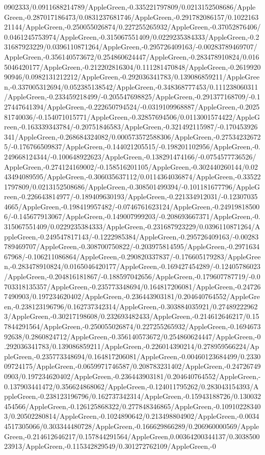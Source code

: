 {\begin{tikzternal}
{0902333/0.0911688214789/AppleGreen,-0.335221797809/0.0213152508686/AppleGreen,-0.287017186473/0.0831237681746/AppleGreen,-0.291782086157/0.102216321144/AppleGreen,-0.250055026874/0.227255265932/AppleGreen,-0.37052876406/0.0461245753974/AppleGreen,-0.315067551409/0.0229235384333/AppleGreen,-0.231687923229/0.0396110871264/AppleGreen,-0.295726409163/-0.00283789469707/AppleGreen,-0.356140573672/0.254860624447/AppleGreen,-0.283478910824/0.0165046420177/AppleGreen,-0.212202816304/0.111281470848/AppleGreen,-0.261992090946/0.0982131212212/AppleGreen,-0.292036341783/0.139086859211/AppleGreen,-0.337005312694/0.052385138542/AppleGreen,-0.348368777453/0.111238060311/AppleGreen,-0.233459218499/-0.205547698825/AppleGreen,-0.291377168709/-0.127447641394/AppleGreen,-0.222650794524/-0.0319109968887/AppleGreen,-0.202581740036/-0.154071015771/AppleGreen,-0.32857694506/0.0113001574422/AppleGreen,-0.163339343784/-0.20751846583/AppleGreen,-0.321492115987/-0.170453926341/AppleGreen,-0.268684324082/0.000573572588306/AppleGreen,-0.275342326725/-0.176766509837/AppleGreen,-0.144021205515/-0.198201102956/AppleGreen,-0.249668124344/-0.100648922623/AppleGreen,-0.138291474166/-0.0754577736526/AppleGreen,-0.274124169002/-0.158516201105/AppleGreen,-0.302440260144/0.0243494089595/AppleGreen,-0.306035637112/0.0114364036874/AppleGreen,-0.335221797809/0.0213152508686/AppleGreen,-0.308501499394/-0.101181677796/AppleGreen,-0.226643814977/-0.189409630193/AppleGreen,-0.221334912031/-0.123070354665/AppleGreen,-0.198419957482/-0.0746761623124/AppleGreen,-0.249198185006/-0.145677913067/AppleGreen,-0.149007999203/-0.208693667371/AppleGreen,-0.315067551409/0.0229235384333/AppleGreen,-0.231687923229/0.0396110871264/AppleGreen,-0.249547817143/-0.1222985384/AppleGreen,-0.295726409163/-0.00283789469707/AppleGreen,-0.308700750822/-0.203975814595/AppleGreen,-0.297163467968/-0.106211086864/AppleGreen,-0.290820337837/-0.176605179283/AppleGreen,-0.283478910824/0.0165046420177/AppleGreen,-0.169427454289/-0.12405786023/AppleGreen,-0.204816181867/-0.188597042656/AppleGreen,-0.179607787719/-0.0703318135357/AppleGreen,-0.235773348694/0.164817206081/AppleGreen,-0.247267490903/0.197234620402/AppleGreen,-0.236443903181/0.204640764552/AppleGreen,-0.238123196796/0.162737342314/AppleGreen,-0.303884035921/0.274892229623/AppleGreen,-0.30217198608/0.232693482433/AppleGreen,-0.214612646217/0.157844291564/AppleGreen,-0.250055026874/0.227255265932/AppleGreen,-0.169467392638/0.2860824712/AppleGreen,-0.356140573672/0.254860624447/AppleGreen,-0.292036341783/0.139086859211/AppleGreen,-0.226014390214/0.278959566224/AppleGreen,-0.235773348694/0.164817206081/AppleGreen,-0.00460123684499/0.233009724175/AppleGreen,-0.0659971746587/0.208783231402/AppleGreen,-0.247267490903/0.197234620402/AppleGreen,-0.236443903181/0.204640764552/AppleGreen,-0.137903441472/0.356624868062/AppleGreen,-0.124011795262/0.283043154393/AppleGreen,-0.238123196796/0.162737342314/AppleGreen,-0.15943188726/0.130032454566/AppleGreen,-0.126125868322/0.277848346865/AppleGreen,-0.109102283403/0.20502280814/AppleGreen,-0.1024890642/0.213498804902/AppleGreen,-0.00344517305066/0.303344480728/AppleGreen,-0.166629866289/0.206960000569/AppleGreen,-0.214612646217/0.157844291564/AppleGreen,0.00364200344137/0.303850023913/AppleGreen,-0.115342829549/0.301272762109/AppleGreen,-0}
\end{tikzternal}}
